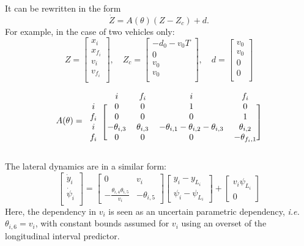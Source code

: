 \documentclass{article}
\begin{document}
It can be rewritten in the form $$\dot{Z} = A(\theta)(Z-Z_c) + d.$$ For example, in the case of two vehicles only:
\begin{equation*}
    Z = \begin{bmatrix}
x_i \\
x_{f_i} \\
v_i \\
v_{f_i} \\
\end{bmatrix}
,\quad
Z_c = \begin{bmatrix}
-d_0-v_0 T \\
0 \\
v_0\\
v_0 \\
\end{bmatrix}
,\quad
d = \begin{bmatrix}
v_0 \\
v_0 \\
0\\
0\\
\end{bmatrix}
\end{equation*}

\begin{equation*}
A(\theta)
=
\begin{blockarray}{ccccc}
 & i & f_i & i & f_i \\
\begin{block}{c[cccc]}
i & 0 & 0 & 1 & 0 \\
f_i & 0 & 0 & 0 & 1 \\
i & -\theta_{i,3} & \theta_{i,3} & -\theta_{i,1}-\theta_{i,2}-\theta_{i,3} & \theta_{i,2} \\
f_i & 0 & 0 & 0 & -\theta_{f_i,1} \\
\end{block}
\end{blockarray}
\end{equation*}

The lateral dynamics are in a similar form:
\begin{equation*}
\begin{bmatrix}
\dot{y}_i \\
\dot{\psi}_i \\
\end{bmatrix}
=
\begin{bmatrix}
0 & v_i \\
-\frac{\theta_{i,4} \theta_{i,5}}{v_i} & -\theta_{i,5}
\end{bmatrix}
\begin{bmatrix}
y_i - y_{L_i} \\
\psi_i - \psi_{L_i}
\end{bmatrix}
+
\begin{bmatrix}
v_i\psi_{L_i} \\
0
\end{bmatrix}
\end{equation*}
Here, the dependency in $v_i$ is seen as an uncertain parametric dependency, \emph{i.e.} $\theta_{i,6}=v_i$, with constant bounds assumed for $v_i$ using an overset of the longitudinal interval predictor.
\end{document}
